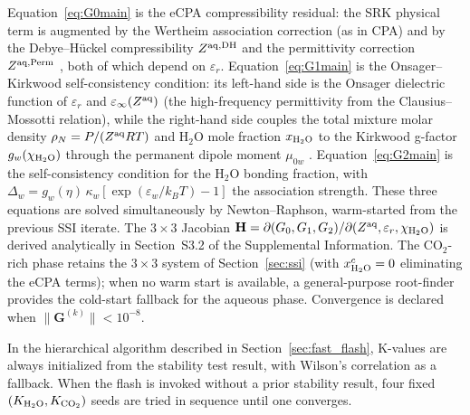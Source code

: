 \documentclass[preprint,12pt,number]{elsarticle}
\begin{document}
Equation~\eqref{eq:G0main} is the eCPA compressibility residual: the SRK physical
term is augmented by the Wertheim association correction (as in CPA) and by the
Debye--Hückel compressibility $Z^{{\rm aq},\text{DH}}$ and the permittivity
correction $Z^{{\rm aq},\text{Perm}}$ \citep{Coelho2025}, both of which depend on $\varepsilon_r$.
Equation~\eqref{eq:G1main} is the Onsager--Kirkwood self-consistency condition:
its left-hand side is the Onsager dielectric function of $\varepsilon_r$ and
$\varepsilon_\infty(Z^{\rm aq})$ (the high-frequency permittivity from the Clausius--Mossotti
relation), while the right-hand side couples the total mixture molar density
$\rho_N = P/(Z^{\rm aq}RT)$ and H$_2$O mole fraction $x_{\rm H_2O}$
to the Kirkwood g-factor $g_w(\chi_{\rm H_2O})$ through the permanent dipole moment
$\mu_{0w}$ \citep{Coelho2025}.
Equation~\eqref{eq:G2main} is the self-consistency condition for the H$_2$O bonding
fraction, with $\Delta_w = g_w(\eta)\,\kappa_w[\exp(\varepsilon_w/k_BT)-1]$
the association strength.
These three equations are solved simultaneously by Newton--Raphson, warm-started
from the previous SSI iterate.
The $3\times 3$ Jacobian $\mathbf{H} = \partial(G_0,G_1,G_2)/\partial(Z^{\rm aq},\varepsilon_r,\chi_{\rm H_2O})$
is derived analytically in Section~S3.2 of the Supplemental Information.
The CO$_2$-rich phase retains the $3\times 3$ system of Section~\ref{sec:ssi}
(with $x_{\rm H_2O}^c=0$ eliminating the eCPA terms);
when no warm start is available, a general-purpose root-finder provides
the cold-start fallback for the aqueous phase.
Convergence is declared when $\|\mathbf{G}^{(k)}\| < 10^{-8}$.

In the hierarchical algorithm described in Section~\ref{sec:fast_flash},
K-values are always initialized from the stability test result, with
Wilson's correlation as a fallback.
When the flash is invoked without a prior stability result, four fixed
$(K_{\rm H_2O}, K_{\rm CO_2})$ seeds are tried in sequence until one converges.
\end{document}
